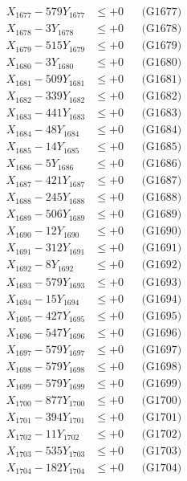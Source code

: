 \documentclass[a4paper,10pt]{article}
\begin{document}
{\begin{align}
X_{1677} - 579Y_{1677} &\leq +0 && \text{(G1677)} \\
X_{1678} - 3Y_{1678} &\leq +0 && \text{(G1678)} \\
X_{1679} - 515Y_{1679} &\leq +0 && \text{(G1679)} \\
X_{1680} - 3Y_{1680} &\leq +0 && \text{(G1680)} \\
\allowbreak
X_{1681} - 509Y_{1681} &\leq +0 && \text{(G1681)} \\
X_{1682} - 339Y_{1682} &\leq +0 && \text{(G1682)} \\
X_{1683} - 441Y_{1683} &\leq +0 && \text{(G1683)} \\
X_{1684} - 48Y_{1684} &\leq +0 && \text{(G1684)} \\
X_{1685} - 14Y_{1685} &\leq +0 && \text{(G1685)} \\
X_{1686} - 5Y_{1686} &\leq +0 && \text{(G1686)} \\
X_{1687} - 421Y_{1687} &\leq +0 && \text{(G1687)} \\
X_{1688} - 245Y_{1688} &\leq +0 && \text{(G1688)} \\
X_{1689} - 506Y_{1689} &\leq +0 && \text{(G1689)} \\
X_{1690} - 12Y_{1690} &\leq +0 && \text{(G1690)} \\
\allowbreak
X_{1691} - 312Y_{1691} &\leq +0 && \text{(G1691)} \\
X_{1692} - 8Y_{1692} &\leq +0 && \text{(G1692)} \\
X_{1693} - 579Y_{1693} &\leq +0 && \text{(G1693)} \\
X_{1694} - 15Y_{1694} &\leq +0 && \text{(G1694)} \\
X_{1695} - 427Y_{1695} &\leq +0 && \text{(G1695)} \\
X_{1696} - 547Y_{1696} &\leq +0 && \text{(G1696)} \\
X_{1697} - 579Y_{1697} &\leq +0 && \text{(G1697)} \\
X_{1698} - 579Y_{1698} &\leq +0 && \text{(G1698)} \\
X_{1699} - 579Y_{1699} &\leq +0 && \text{(G1699)} \\
X_{1700} - 877Y_{1700} &\leq +0 && \text{(G1700)} \\
\allowbreak
X_{1701} - 394Y_{1701} &\leq +0 && \text{(G1701)} \\
X_{1702} - 11Y_{1702} &\leq +0 && \text{(G1702)} \\
X_{1703} - 535Y_{1703} &\leq +0 && \text{(G1703)} \\
X_{1704} - 182Y_{1704} &\leq +0 && \text{(G1704)} \\

\end{align}}
\end{document}
